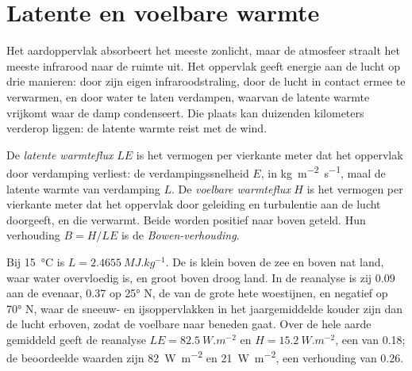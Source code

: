 \section{Latente en voelbare warmte}\label{sec:b1:radiation-heat-transport:latent}

Het aardoppervlak absorbeert het meeste zonlicht, maar de atmosfeer straalt het meeste infrarood naar de ruimte uit. Het oppervlak geeft energie aan de lucht op drie manieren: door zijn eigen infraroodstraling, door de lucht in contact ermee te verwarmen, en door water te laten verdampen, waarvan de latente warmte vrijkomt waar de damp condenseert. Die plaats kan duizenden kilometers verderop liggen: de latente warmte reist met de wind.

\begin{definition}\label{def:b1:radiation-heat-transport:surface-fluxes}
De \emph{latente warmteflux} $LE$ is het vermogen per vierkante meter dat het oppervlak door verdamping verliest: de verdampingssnelheid $E$, in
\unit{kg.m^{-2}.s^{-1}}, maal de latente warmte van verdamping $L$. De \emph{voelbare warmteflux} $H$ is het vermogen per vierkante meter dat het oppervlak door geleiding en turbulentie aan de lucht doorgeeft, en die verwarmt. Beide worden positief naar boven geteld. Hun verhouding $B = H/LE$ is de \emph{Bowen-verhouding}.
\end{definition}

Bij \qty{15}{\celsius} is $L = \qty{2.4655}{MJ.kg^{-1}}$. De  is klein boven de zee en boven nat land, waar water overvloedig is, en groot boven droog land. In de reanalyse is zij \num{0.09} aan de evenaar, \num{0.37} op \ang{25} N, de  van de grote hete woestijnen, en negatief op \ang{70} N, waar de sneeuw- en ijsoppervlakken in het jaargemiddelde kouder zijn dan de lucht erboven, zodat de voelbare  naar beneden gaat. Over de hele aarde gemiddeld geeft de reanalyse $LE =
\qty{82.5}{W.m^{-2}}$ en $H = \qty{15.2}{W.m^{-2}}$, een  van \num{0.18}; de beoordeelde waarden zijn \qty{82}{W.m^{-2}} en \qty{21}{W.m^{-2}}, een verhouding van \num{0.26}.


